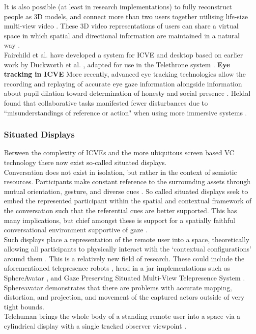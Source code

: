        It is also possible (at least in research implementations) to fully reconstruct people as 3D models, and connect more than two users together utilising life-size multi-view video \cite{Roberts2015, Grau2007, Divorra2010, Gross2003, Beck2013}. These 3D video representations of users can share a virtual space in which spatial and directional information are maintained in a natural way \cite{Roberts2015, Wolff2008}. \\
       Fairchild et al. have developed a system for ICVE and desktop based on earlier work by Duckworth et al. \cite{Duckworth:2012tx}, adapted for use in the Telethrone system \cite{Fairchild2016}.
            \textbf{Eye tracking in ICVE}
                More recently, advanced eye tracking technologies allow the recording and replaying of accurate eye gaze information\cite{Ciger2004a, Steptoe2009, Steptoe2008} alongside information about pupil dilation toward determination of honesty and social presence \cite{Steptoe2010a}.
            Heldal found that collaborative tasks manifested fewer disturbances due to ``misunderstandings of reference or action" when using more immersive systems \cite{Heldal2005}.
        \subsubsection{Situated Displays}
            Between the complexity of ICVEs and the more ubiquitous screen based VC technology there now exist so-called situated displays.\\
    Conversation does not exist in isolation, but rather in the context of semiotic resources. Participants make constant reference to the surrounding assets through mutual orientation, gesture, and diverse cues \cite{Goodwin2000a}.
            So called situated displays seek to embed the represented participant within the spatial and contextual framework of the conversation such that the referential cues are better supported. This has many implications, but chief amongst these is support for a spatially faithful conversational environment supportive of gaze \cite{Pan2014a, Oyekoya2012, Pan2012a, Zhang2013a}.\\
                    Such displays place a representation of the remote user into a space, theoretically allowing all participants to physically interact with the `contextual configurations' around them \cite{Goodwin2000a}. This is a relatively new field of research.  These could include the aforementioned telepresence robots \cite{Lee2011b, Sakamoto2007, Tsui2011}, head in a jar implementations such as SphereAvatar \cite{Oyekoya2012, pan2014comparing, Pan2012a},  and Gaze Preserving Situated Multi-View Telepresence System \cite{Pan2014a}.   Sphereavatar \cite{Oyekoya2012} demonstrates that there are problems with accurate mapping, distortion, and projection, and movement of the captured actors outside of very tight bounds.\\
                     Telehuman brings the whole body of a standing remote user into a space via a cylindrical display with a single tracked observer viewpoint \cite{Kim2012}.\\
